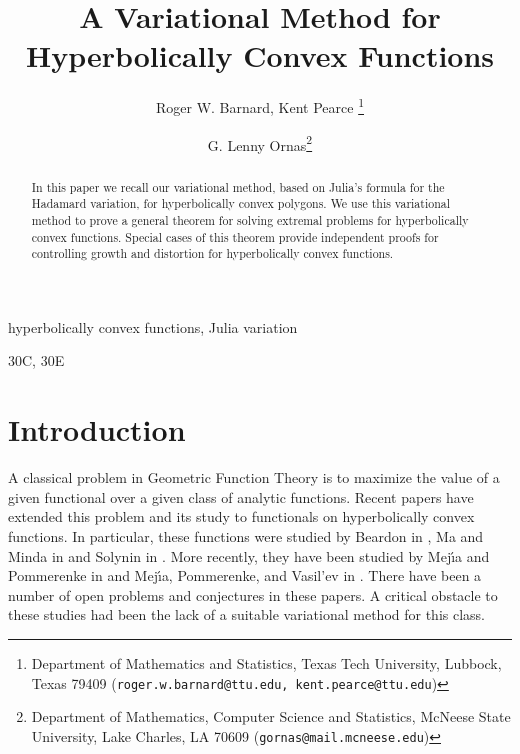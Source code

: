 \documentclass[final]{siamltex}
\title{\large A Variational Method for Hyperbolically Convex Functions}
\begin{document}
\author{Roger W. Barnard, Kent Pearce \thanks{Department of 
Mathematics and Statistics,  Texas Tech University, 
Lubbock, Texas  79409 
({\tt roger.w.barnard@ttu.edu, kent.pearce@ttu.edu}) }
\and G. Lenny Ornas\thanks {Department of Mathematics, Computer Science and Statistics, McNeese State University, Lake Charles, LA  70609
({\tt gornas@mail.mcneese.edu}) }
}




\maketitle 

\begin{abstract}
In this paper we recall our variational method, based on Julia's formula for the Hadamard variation, for hyperbolically convex polygons.  We use this variational method to prove a general theorem for solving extremal problems for hyperbolically convex functions.  Special cases of this theorem provide independent proofs for controlling growth and distortion for hyperbolically convex functions.
\end{abstract}

\begin{keywords} 
hyperbolically convex functions, Julia variation
\end{keywords}

\begin{AMS}
30C, 30E\end{AMS}

\pagestyle{myheadings}
\thispagestyle{plain}

\section{Introduction} 

A classical problem in Geometric Function Theory is to maximize the value of a given functional over a given class of analytic functions.  Recent papers have extended this problem and its study to functionals on hyperbolically convex functions.  In particular, these functions were studied by Beardon in \cite{aB83}, Ma and Minda in \cite{MM94,MM99} and Solynin in \cite{aS98,aS99}.  More recently, they have been studied by Mej{\'{\i}}a and Pommerenke in \cite{PM00,MP00b,MP01,MP02,MP00} and Mej{\'{\i}}a, Pommerenke, and Vasil'ev in \cite{MPV01}.  There have been a number of open problems and conjectures in these papers.  A critical obstacle to these studies had been the lack of a suitable variational method for this class.  
\end{document}
